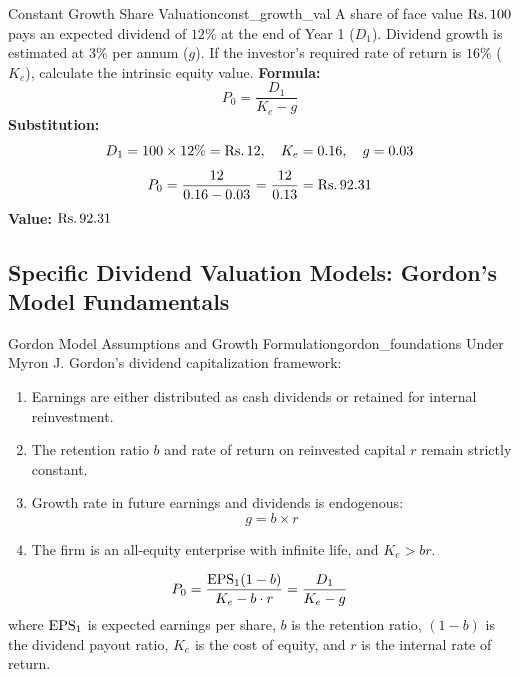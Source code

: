 \begin{example}{Constant Growth Share Valuation}{const_growth_val}
A share of face value $\text{Rs.}\, 100$ pays an expected dividend of $12\%$ at the end of Year 1 ($D_1$). Dividend growth is estimated at $3\%$ per annum ($g$). If the investor's required rate of return is $16\%$ ($K_e$), calculate the intrinsic equity value.
\tcblower
\textbf{Formula:}
\begin{equation*}
    P_0 = \frac{D_1}{K_e - g}
\end{equation*}
\textbf{Substitution:}
\begin{equation*}
    D_1 = 100 \times 12\% = \text{Rs.}\, 12, \quad K_e = 0.16, \quad g = 0.03
\end{equation*}
\begin{equation*}
    P_0 = \frac{12}{0.16 - 0.03} = \frac{12}{0.13} = \text{Rs.}\, 92.31
\end{equation*}
\textbf{Value:} $\text{Rs.}\, 92.31$
\end{example}

\subsection{Specific Dividend Valuation Models: Gordon's Model Fundamentals}

\begin{definition}{Gordon Model Assumptions and Growth Formulation}{gordon_foundations}
Under Myron J. Gordon's dividend capitalization framework:
\begin{enumerate}[noitemsep, leftmargin=*]
    \item Earnings are either distributed as cash dividends or retained for internal reinvestment.
    \item The retention ratio $b$ and rate of return on reinvested capital $r$ remain strictly constant.
    \item Growth rate in future earnings and dividends is endogenous:
    \begin{equation}
        g = b \times r
    \end{equation}
    \item The firm is an all-equity enterprise with infinite life, and $K_e > br$.
\end{enumerate}
\end{definition}

\begin{formulabox}
\begin{equation}
    P_0 = \frac{\operatorname{EPS}_1 (1 - b)}{K_e - b \cdot r} = \frac{D_1}{K_e - g}
\end{equation}
where $\operatorname{EPS}_1$ is expected earnings per share, $b$ is the retention ratio, $(1 - b)$ is the dividend payout ratio, $K_e$ is the cost of equity, and $r$ is the internal rate of return.
\end{formulabox}

